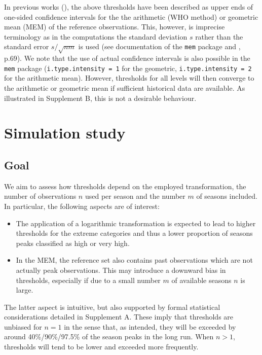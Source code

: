 \documentclass{article}
\newcommand{\sd}{s}
\begin{document}
In previous works (\citealt{WHO2014, Vega2015}), the above thresholds have been described as upper ends of one-sided confidence intervals for the the arithmetic (WHO method) or geometric mean (MEM) of the reference observations. This, however, is imprecise terminology as in the computations the standard deviation $\sd$ rather than the standard error $\sd/\sqrt{nm}$ is used (see documentation of the \texttt{mem} package and \citealt{WHO2014}, p.69). We note that the use of actual confidence intervals is also possible in the \texttt{mem} package (\texttt{i.type.intensity = 1} for the geometric, \texttt{i.type.intensity = 2} for the arithmetic mean). However, thresholds for all levels will then converge to the arithmetic or geometric mean if sufficient historical data are available. As illustrated in Supplement B, this is not a desirable behaviour.
 

\section{Simulation study}
\label{sec:simulation}

\subsection{Goal}

We aim to assess how thresholds depend on the employed transformation, the number of observations $n$ used per season and the number $m$ of seasons included. In particular, the following aspects are of interest:

\begin{itemize}
\item The application of a logarithmic transformation is expected to lead to higher thresholds for the extreme categories and thus a lower proportion of seasons peaks classified as high or very high.
\item In the MEM, the reference set also contains past observations which are not actually peak observations. This may introduce a downward bias in thresholds, especially if due to a small number $m$ of available seasons $n$ is large.
\end{itemize}
The latter aspect is intuitive, but also supported by formal statistical considerations detailed in Supplement A. These imply that thresholds are unbiased for $n = 1$ in the sense that, as intended, they will be exceeded by around 40\%/90\%/97.5\% of the season peaks in the long run. When $n > 1$, thresholds will tend to be lower and exceeded more frequently.
\end{document}
